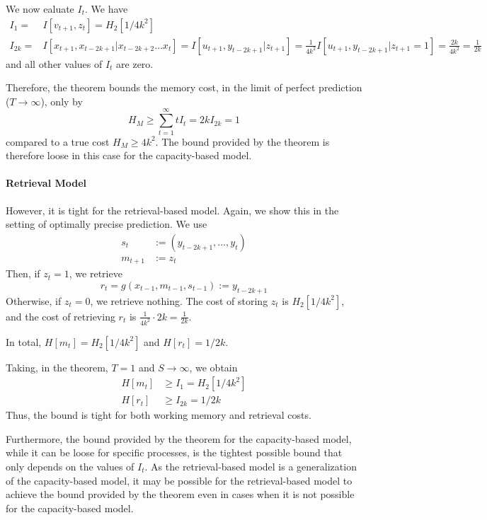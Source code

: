 \documentclass[11pt,letterpaper]{article}
\newcounter{theorem}
\begin{document}
We now ealuate $I_t$. We have
\begin{align}
I_1 =& I[v_{t+1}, z_t] = H_2[1/4k^2] \\
   I_{2k} =& I[x_{t+1}, x_{t-2k+1}|x_{t-2k+2}\dots x_t] = I[u_{t+1}, y_{t-2k+1}|z_{t+1}] = \frac{1}{4k^2} I[u_{t+1}, y_{t-2k+1}|z_{t+1}=1] = \frac{2k}{4k^2} = \frac{1}{2k} 
\end{align}
and all other values of $I_t$ are zero.

Therefore, the theorem bounds the memory cost, in the limit of perfect prediction ($T\rightarrow \infty$), only by
\begin{equation}
    H_M \geq \sum_{t=1}^\infty t I_t = 2k I_{2k} = 1
\end{equation}
compared to a true cost $H_M \geq 4k^2$.
The bound provided by the theorem is therefore loose in this case for the capacity-based model.

\paragraph{Retrieval Model}
However, it is tight for the retrieval-based model.
Again, we show this in the setting of optimally precise prediction.
We use
\begin{align}
    s_t & := \left(y_{t-2k+1}, \dots, y_{t}\right) \\
    m_{t+1} & := z_t
\end{align}
Then, if $z_t = 1$, we retrieve
\begin{equation}
    r_t = g(x_{t-1}, m_{t-1}, s_{t-1}) := y_{t-2k+1}
\end{equation}
Otherwise, if $z_t=0$, we retrieve nothing.
The cost of storing $z_t$ is $H_2[1/4k^2]$, and the cost of retrieving $r_t$ is $\frac{1}{4k^2} \cdot 2k = \frac{1}{2k}$.



In total, $H[m_t] = H_2[1/4k^2]$ and $H[r_t] = 1/2k$.

Taking, in the theorem, $T=1$ and $S\rightarrow\infty$, we obtain 
\begin{align}
    H[m_t] &\geq I_1 = H_2[1/4k^2] \\
    H[r_t] &\geq I_{2k} = 1/2k
\end{align}
Thus, the bound is tight for both working memory and retrieval costs.


Furthermore, the bound provided by the theorem for the capacity-based model, while it can be loose for specific processes, is the tightest possible bound that only depends on the values of $I_t$.
As the retrieval-based model is a generalization of the capacity-based model, it may be possible for the retrieval-based model to achieve the bound provided by the theorem even in cases when it is not possible for the capacity-based model.
\end{document}
